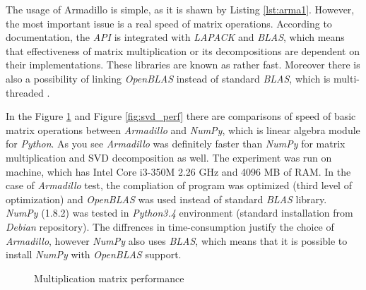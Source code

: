 

The usage of Armadillo is simple, as it is shawn by Listing \ref{lst:arma1}. However, the most important issue is a real speed of matrix operations. According to documentation, the \textit{API} is integrated with \textit{LAPACK} and \textit{BLAS}, which means that effectiveness of matrix multiplication or its decompositions are dependent on their implementations. These libraries are known as rather fast. Moreover there is also a possibility of linking \textit{OpenBLAS} instead of standard \textit{BLAS}, which is multi-threaded \cite{Arma}. 

In the Figure \ref{fig:mul_perf} and Figure \ref{fig:svd_perf}  there are comparisons of speed of basic matrix operations between \textit{Armadillo} and \textit{NumPy}, which is linear algebra module for \textit{Python}. As you see \textit{Armadillo} was definitely faster than \textit{NumPy} for matrix multiplication and SVD decomposition as well.   
The experiment was run on machine, which has Intel Core i3-350M 2.26 GHz and 4096 MB of RAM. In the case of \textit{Armadillo} test, the compliation of program was optimized (third level of optimization) and \textit{OpenBLAS} was used instead of standard \textit{BLAS} library. \textit{NumPy} (1.8.2) was tested in \textit{Python3.4} environment (standard installation from \textit{Debian} repository). The diffrences in time-consumption justify the choice of \textit{Armadillo}, however \textit{NumPy} also uses \textit{BLAS}, which means that it is possible to install \textit{NumPy} with \textit{OpenBLAS} support.

\begin{figure}[h]
\centering
\label{fig:mul_perf}
\caption{Multiplication matrix performance}
\end{figure}

